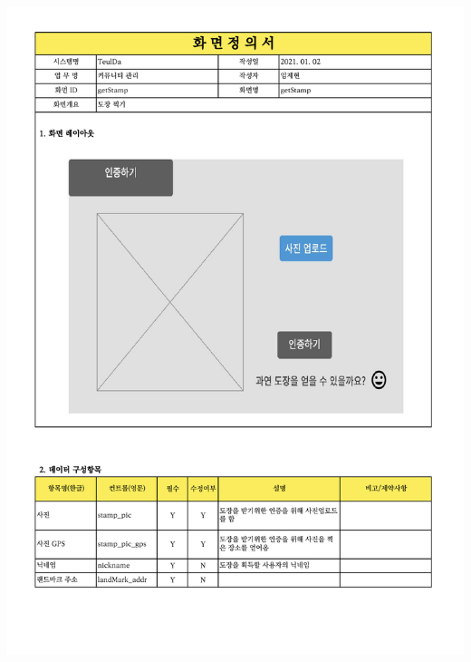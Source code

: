 {{{{{{{{{{{{{{{{{{{{{{{{{{{{{{{{{{{{{{{{{{{{{{{{{{{{{{{{{{{{\includegraphics[width=20cm]{./Figure/Analysis/Display/community/community_19.pdf} \\
}}}}}}}}}}}}}}}}}}}}}}}}}}}}}}}}}}}}}}}}}}}}}}}}}}}}}}}}}}}}
